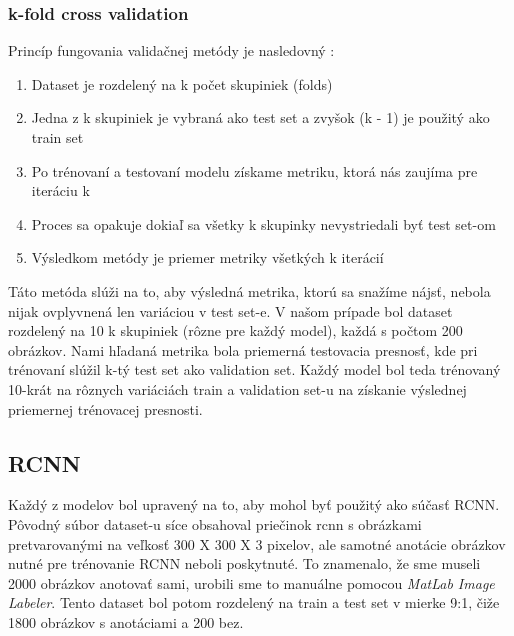 \documentclass[journal,onecolumn]{IEEEtran}
\begin{document}
\subsubsection{k-fold cross validation}
Princíp fungovania validačnej metódy je nasledovný :
\begin{enumerate}
  \item Dataset je rozdelený na k počet skupiniek (folds)
  \item Jedna z k skupiniek je vybraná ako test set a zvyšok (k - 1) je použitý ako train set
  \item Po trénovaní a testovaní modelu získame metriku, ktorá nás zaujíma pre iteráciu k
  \item Proces sa opakuje dokiaľ sa všetky k skupinky nevystriedali byť test set-om
  \item Výsledkom metódy je priemer metriky všetkých k iterácií
\end{enumerate}
\vspace{10pt}
Táto metóda slúži na to, aby výsledná metrika, ktorú sa snažíme nájsť, nebola nijak ovplyvnená len variáciou v test set-e. V našom prípade bol dataset rozdelený na 10 k skupiniek (rôzne pre každý model), každá s počtom 200 obrázkov. Nami hľadaná metrika bola priemerná testovacia presnosť, kde pri trénovaní slúžil k-tý test set ako validation set. Každý model bol teda trénovaný 10-krát na rôznych variáciách train a validation set-u na získanie výslednej priemernej trénovacej presnosti.  

\subsection{RCNN}
Každý z modelov bol upravený na to, aby mohol byť použitý ako súčasť RCNN. Pôvodný súbor dataset-u síce obsahoval priečinok rcnn s obrázkami pretvarovanými na veľkosť 300 X 300 X 3 pixelov, ale samotné anotácie obrázkov nutné pre trénovanie RCNN neboli poskytnuté. To znamenalo, že sme museli 2000 obrázkov anotovať sami, urobili sme to manuálne pomocou {\it MatLab Image Labeler}. Tento dataset bol potom rozdelený na train a test set v mierke 9:1, čiže 1800 obrázkov s anotáciami a 200 bez.

\vspace{10pt}
\end{document}
